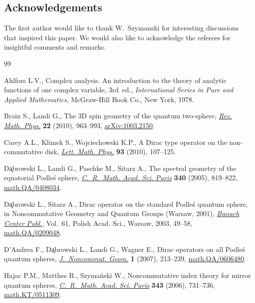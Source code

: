 \documentclass[pdftex]{sigma}
\numberwithin{equation}{section}
\begin{document}
\subsection*{Acknowledgements}

The f\/irst author would like to thank W.~Szymanski for interesting discussions that inspired this paper.
We would also like to acknowledge the referees for insightful comments and remarks.

\begin{thebibliography}{99}
\footnotesize\itemsep=0pt

Ahlfors L.V., Complex analysis. An introduction to the theory of analytic
  functions of one complex variable, 3rd~ed., \textit{International Series in Pure and
  Applied Mathematics}, McGraw-Hill Book Co., New York, 1978.

Brain S., Landi G., The 3{D} spin geometry of the quantum two-sphere,
  \href{http://dx.doi.org/10.1142/S0129055X10004119}{\textit{Rev. Math. Phys.}} \textbf{22} (2010), 963--993, \href{http://arxiv.org/abs/1003.2150}{arXiv:1003.2150}.

Carey A.L., Klimek S., Wojciechowski K.P., A {D}irac type operator on the
  non-commutative disk, \href{http://dx.doi.org/10.1007/s11005-010-0391-7}{\textit{Lett. Math. Phys.}} \textbf{93} (2010),
  107--125.

D{\c{a}}browski L., Landi G., Paschke M., Sitarz A., The spectral geometry of
  the equatorial {P}odle\'s sphere, \href{http://dx.doi.org/10.1016/j.crma.2005.04.003}{\textit{C.~R.~Math. Acad. Sci. Paris}}
  \textbf{340} (2005), 819--822, \href{http://arxiv.org/abs/math.QA/0408034}{math.QA/0408034}.

D{\c{a}}browski L., Sitarz A., Dirac operator on the standard {P}odle\'s
  quantum sphere, in Noncommutative Geometry and Quantum Groups ({W}arsaw,
  2001), \href{http://dx.doi.org/10.4064/bc61-0-4}{\textit{Banach Center Publ.}}, Vol.~61, Polish Acad. Sci., Warsaw,
  2003, 49--58, \href{http://arxiv.org/abs/math.QA/0209048}{math.QA/0209048}.

D'Andrea F., D{\c{a}}browski L., Landi G., Wagner E., Dirac operators on all
  {P}odle\'s quantum spheres, \href{http://dx.doi.org/10.4171/JNCG/5}{\textit{J.~Noncommut. Geom.}} \textbf{1} (2007),
  213--239, \href{http://arxiv.org/abs/math.QA/0606480}{math.QA/0606480}.

Hajac P.M., Matthes R., Szyma{\'n}ski W., Noncommutative index theory for
  mirror quantum spheres, \href{http://dx.doi.org/10.1016/j.crma.2006.09.021}{\textit{C.~R.~Math. Acad. Sci. Paris}} \textbf{343}
  (2006), 731--736, \href{http://arxiv.org/abs/math.KT/0511309}{math.KT/0511309}.


\end{thebibliography}
\end{document}

